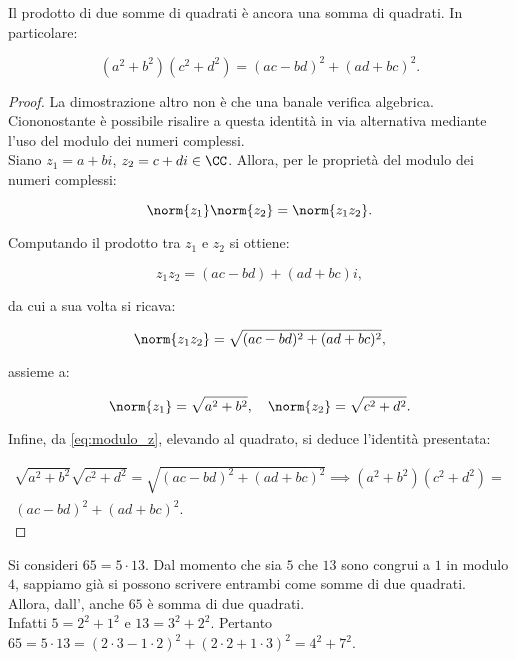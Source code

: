 \begin{proposition}
    \label{prop:fibonacci}
    Il prodotto di due somme di quadrati è ancora una
    somma di quadrati. In particolare:

    \[ (a^2+b^2)(c^2+d^2)=(ac-bd)^2+(ad+bc)^2. \]
\end{proposition}

\begin{proof}
    La dimostrazione altro non è che una banale verifica
    algebrica. Ciononostante è possibile risalire a questa
    identità in via alternativa mediante l'uso
    del modulo dei numeri complessi. \\

    Siano $z_1=a+bi$, $z_2=c+di \in \CC$. Allora, per le proprietà
    del modulo dei numeri complessi:

    \begin{equation}
        \label{eq:modulo_z}
        \norm{z_1}\norm{z_2}=\norm{z_1z_2}.
    \end{equation}


    Computando il prodotto tra $z_1$ e $z_2$ si ottiene:

    \[ z_1z_2 = (ac-bd) + (ad+bc)i, \]

    da cui a sua volta si ricava:

    \[ \norm{z_1z_2} = \sqrt{(ac-bd)^2 + (ad+bc)^2}, \]

    assieme a:

    \[ \norm{z_1}=\sqrt{a^2+b^2}, \quad \norm{z_2}=\sqrt{c^2+d^2}. \]

    Infine, da \eqref{eq:modulo_z}, elevando al quadrato, si deduce l'identità
    presentata:

    \begin{multline*}
        \sqrt{a^2+b^2}\sqrt{c^2+d^2}=\sqrt{(ac-bd)^2 + (ad+bc)^2} \implies (a^2+b^2)(c^2+d^2)= \\ (ac-bd)^2+(ad+bc)^2.
    \end{multline*}
\end{proof}

\begin{example}
    Si consideri $65=5 \cdot 13$. Dal momento che sia $5$
    che $13$ sono congrui a $1$ in modulo $4$, sappiamo
    già si possono scrivere entrambi come somme di due
    quadrati. Allora, dall',
    anche $65$ è somma di due quadrati. \\

    Infatti $5=2^2+1^2$ e $13=3^2+2^2$. Pertanto
    $65=5\cdot 13=(2\cdot3-1\cdot2)^2 + (2\cdot2+1\cdot3)^2=4^2+7^2$.
\end{example}

